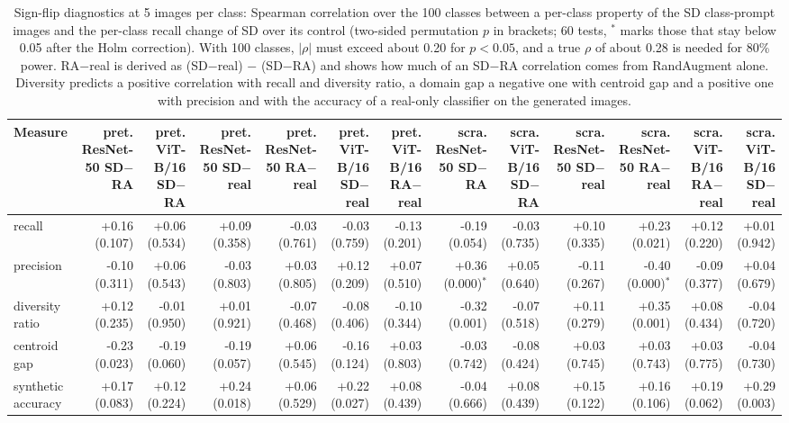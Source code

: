 \begin{table}[H]
\centering
\small
\setlength{\tabcolsep}{3pt}
\caption{Sign-flip diagnostics at 5 images per class: Spearman correlation over the 100 classes between a per-class property of the SD class-prompt images and the per-class recall change of SD over its control (two-sided permutation $p$ in brackets; 60 tests, $^{*}$ marks those that stay below 0.05 after the Holm correction). With 100 classes, $|\rho|$ must exceed about 0.20 for $p < 0.05$, and a true $\rho$ of about 0.28 is needed for 80\% power. RA$-$real is derived as (SD$-$real) $-$ (SD$-$RA) and shows how much of an SD$-$RA correlation comes from RandAugment alone. Diversity predicts a positive correlation with recall and diversity ratio, a domain gap a negative one with centroid gap and a positive one with precision and with the accuracy of a real-only classifier on the generated images.}
\label{tab:sign-flip}
\begin{tabular}{lrrrrrrrrrrrr}
\toprule
Measure & pret. ResNet-50 SD$-$RA & pret. ViT-B/16 SD$-$RA & pret. ResNet-50 SD$-$real & pret. ResNet-50 RA$-$real & pret. ViT-B/16 SD$-$real & pret. ViT-B/16 RA$-$real & scra. ResNet-50 SD$-$RA & scra. ViT-B/16 SD$-$RA & scra. ResNet-50 SD$-$real & scra. ResNet-50 RA$-$real & scra. ViT-B/16 RA$-$real & scra. ViT-B/16 SD$-$real \\
\midrule
recall & +0.16 (0.107) & +0.06 (0.534) & +0.09 (0.358) & -0.03 (0.761) & -0.03 (0.759) & -0.13 (0.201) & -0.19 (0.054) & -0.03 (0.735) & +0.10 (0.335) & +0.23 (0.021) & +0.12 (0.220) & +0.01 (0.942) \\
precision & -0.10 (0.311) & +0.06 (0.543) & -0.03 (0.803) & +0.03 (0.805) & +0.12 (0.209) & +0.07 (0.510) & +0.36 (0.000)$^{*}$ & +0.05 (0.640) & -0.11 (0.267) & -0.40 (0.000)$^{*}$ & -0.09 (0.377) & +0.04 (0.679) \\
diversity ratio & +0.12 (0.235) & -0.01 (0.950) & +0.01 (0.921) & -0.07 (0.468) & -0.08 (0.406) & -0.10 (0.344) & -0.32 (0.001) & -0.07 (0.518) & +0.11 (0.279) & +0.35 (0.001) & +0.08 (0.434) & -0.04 (0.720) \\
centroid gap & -0.23 (0.023) & -0.19 (0.060) & -0.19 (0.057) & +0.06 (0.545) & -0.16 (0.124) & +0.03 (0.803) & -0.03 (0.742) & -0.08 (0.424) & +0.03 (0.745) & +0.03 (0.743) & +0.03 (0.775) & -0.04 (0.730) \\
synthetic accuracy & +0.17 (0.083) & +0.12 (0.224) & +0.24 (0.018) & +0.06 (0.529) & +0.22 (0.027) & +0.08 (0.439) & -0.04 (0.666) & +0.08 (0.439) & +0.15 (0.122) & +0.16 (0.106) & +0.19 (0.062) & +0.29 (0.003) \\
\bottomrule
\end{tabular}
\end{table}
